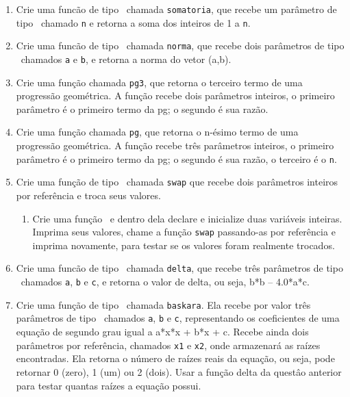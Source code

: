 \begin{enumerate}
    \item Crie uma funcão de tipo \INT\ chamada {\tt somatoria}, que recebe um parâmetro de tipo \INT\ chamado {\tt n} e retorna a soma dos inteiros de 1 a {\tt n}.


    \item Crie uma funcão de tipo \DOUBLE\ chamada {\tt norma}, que recebe dois parâmetros de tipo \DOUBLE\ chamados {\tt a} e {\tt b}, e retorna a norma do vetor (a,b).

    \item Crie uma função chamada {\tt pg3}, que retorna o terceiro termo de uma progressão geométrica. A função recebe dois parâmetros inteiros, o primeiro parâmetro é o primeiro termo da pg; o segundo é sua razão.

    \item Crie uma função chamada {\tt pg}, que retorna o n-ésimo termo de uma progressão geométrica. A função recebe três parâmetros inteiros, o primeiro parâmetro é o primeiro termo da pg; o segundo é sua razão, o terceiro é o {\tt n}.

    \item Crie uma função de tipo \VOID\ chamada {\tt swap} que recebe dois parâmetros inteiros por referência e troca seus valores.
      \begin{enumerate}
        \item Crie uma função  \MAIN\ e dentro dela declare e inicialize duas variáveis inteiras. Imprima seus valores, chame a função {\tt swap} passando-as por referência e imprima novamente, para testar se os valores foram realmente trocados.
      \end{enumerate}

    \item Crie uma funcão de tipo \DOUBLE\ chamada {\tt delta}, que recebe três parâmetros de tipo \DOUBLE\ chamados {\tt a}, {\tt b} e {\tt c}, e retorna o valor de delta, ou seja, b*b – 4.0*a*c.

    \item Crie uma função de tipo \INT\ chamada {\tt baskara}. Ela recebe por valor três parâmetros de tipo \INT\ chamados {\tt a}, {\tt b} e {\tt c}, representando os coeficientes de uma equação de segundo grau igual a a*x*x + b*x + c. Recebe ainda dois parâmetros por referência, chamados {\tt x1} e {\tt x2}, onde armazenará as raízes encontradas. Ela retorna o número de raízes reais da equação, ou seja, pode retornar 0 (zero), 1 (um) ou 2 (dois). Usar a função  delta da questâo anterior para testar quantas raízes a equação possui.

  \end{enumerate}
